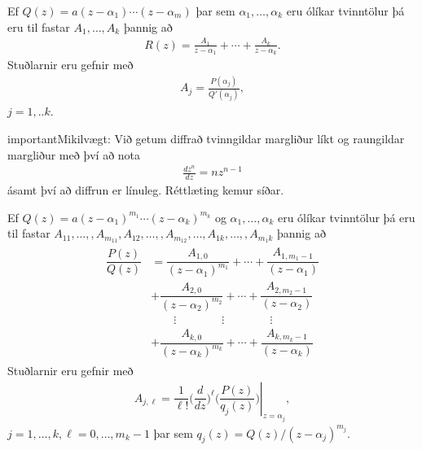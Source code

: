 \documentclass[a4paper,10pt,icelandic]{sphinxmanual}
\begin{document}
Ef \(Q(z)=a(z-\alpha_1)\cdots(z-\alpha_m)\) þar sem \(\alpha_1, \ldots, \alpha_k\) eru ólíkar tvinntölur þá eru til fastar \(A_1, \ldots, A_k\) þannig að
\begin{equation*}
\begin{split}R(z)=\frac{A_1}{z-\alpha_1}+\cdots+\frac{A_k}{z-\alpha_k}.\end{split}
\end{equation*}
Stuðlarnir eru gefnir með
\begin{equation*}
\begin{split}A_j = \frac{P(\alpha_j)}{Q'(\alpha_j)},\end{split}
\end{equation*}
\(j=1,..k\).

\begin{sphinxadmonition}{important}{Mikilvægt:}
Við getum diffrað tvinngildar margliður líkt og raungildar margliður með því að nota
\begin{equation*}
\begin{split}\frac{dz^n}{dz} = n z^{n-1}\end{split}
\end{equation*}
ásamt því að diffrun er línuleg. Réttlæting kemur síðar.
\end{sphinxadmonition}

Ef \(Q(z)=a(z-\alpha_1)^{m_1}\cdots(z-\alpha_k)^{m_k}\)  og \(\alpha_1, \ldots, \alpha_k\) eru ólíkar tvinntölur þá eru til fastar
\(A_{11},\ldots, ,A_{m_11}, A_{12},\ldots, ,A_{m_12}, \ldots, A_{1k},\ldots, ,A_{m_1k}\) þannig að
\begin{equation*}
\begin{split}\begin{aligned}
 \dfrac{P(z)}{Q(z)}&=
 \dfrac{A_{1,0}}{(z-\alpha_1)^{m_1}}+\cdots+\dfrac{A_{1,m_1-1}}{(z-\alpha_1)}\\
 &+\dfrac{A_{2,0}}{(z-\alpha_2)^{m_2}}+\cdots+\dfrac{A_{2,m_2-1}}{(z-\alpha_2)}
 \\
 &\qquad \vdots\qquad\qquad\vdots\qquad \qquad \vdots\\
 &+\dfrac{A_{k,0}}{(z-\alpha_k)^{m_k}}+\cdots+\dfrac{A_{k,m_k-1}}{(z-\alpha_k)}\end{aligned}\end{split}
\end{equation*}
Stuðlarnir eru gefnir með
\begin{equation*}
\begin{split}A_{j,\ell}=\left.\dfrac 1{\ell!}
 \bigg(\dfrac {d}{dz}\bigg)^{\ell}\bigg(
 \dfrac{P(z)}{q_j(z)}\bigg)\right|_{z=\alpha_j},\end{split}
\end{equation*}
\(j=1,\dots,k, \ell=0,\dots,m_k-1\) þar sem \(q_j(z) = Q(z)/(z-\alpha_j)^{m_j}\).
\end{document}
